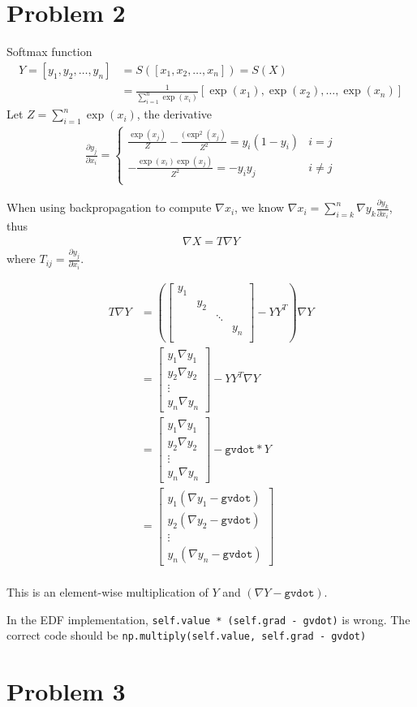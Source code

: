 \documentclass{article}
\begin{document}
\section*{Problem 2}
Softmax function
\begin{align*}
Y = [y_1,y_2,\ldots,y_n] &= S([x_1,x_2,\ldots,x_n]) = S(X)\\
&= \frac{1}{\sum_{i=1}^n
\exp(x_i)}[\exp(x_1),\exp(x_2),\ldots,\exp(x_n)]
\end{align*}
Let $Z = \sum_{i=1}^n\exp(x_i)$, the derivative
\begin{align*}
\frac{\partial y_j}{\partial x_i} =
\left\{
\begin{array}{cc}
\frac{\exp(x_j)}{Z}-\frac{(\exp^2(x_j)}{Z^2} = y_i(1-y_i) & i = j \\
-\frac{\exp(x_i)\exp(x_j)}{Z^2} = -y_iy_j & i \neq j \\
\end{array}
\right.
\end{align*}

When using backpropagation to compute $\nabla x_i$, we know $\nabla x_i =
\sum_{i=k}^n \nabla y_k \frac{\partial y_k}{\partial x_i}$, thus
\begin{align*}
\nabla X = T\nabla Y
\end{align*}
where $T_{ij} = \frac{\partial y_j}{\partial x_i}$.

\begin{align*}
T\nabla Y &= \left(\left[ 
\begin{array}{cccc}
y_1 & & & \\
 &y_2 & &\\
& & \ddots & \\
& & & y_n\\
\end{array}
\right] - YY^T\right)\nabla Y \\
&= \left[\begin{array}{c}y_1\nabla y_1\\y_2\nabla
y_2\\\vdots\\y_n\nabla y_n\end{array}\right] - YY^T\nabla Y\\
&= \left[\begin{array}{c}y_1\nabla y_1\\y_2\nabla
y_2\\\vdots\\y_n\nabla y_n\end{array}\right] - \texttt{gvdot}*Y\\
&=\left[\begin{array}{c}y_1(\nabla y_1 - \texttt{gvdot})\\y_2(\nabla
y_2-\texttt{gvdot})\\\vdots\\y_n(\nabla
y_n-\texttt{gvdot})\end{array}\right]\\
\end{align*}

This is an element-wise multiplication of $Y$ and $(\nabla Y - \texttt{gvdot})$.

In the EDF implementation, \texttt{self.value *
(self.grad - gvdot)} is wrong. The correct code should be
\texttt{np.multiply(self.value, self.grad - gvdot)}

\section*{Problem 3}
\end{document}
